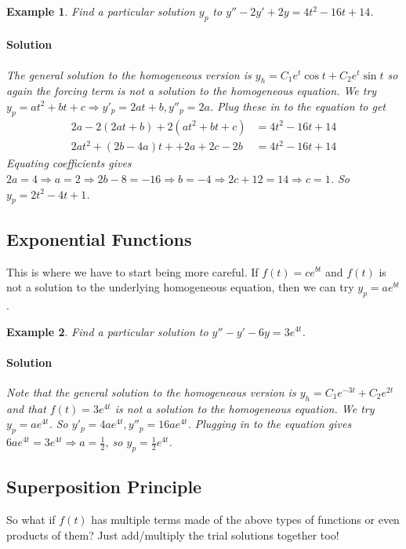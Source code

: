 \documentclass[letterpaper, 11pt, openany]{book}
\theoremstyle{mytheoremstyle}
\theoremstyle{myexamplestyle}
\newtheorem{example}{Example}[section]
\newenvironment{solution}{\paragraph{\sffamily \smaller \fontseries{b}\selectfont Solution}}{\hfill\faSquare}
\begin{document}
\begin{example}
    Find a particular solution \(y_{p}\) to \(y'' - 2y' + 2y  = 4 t^{2}-16 t+14\).
    \begin{solution}
        The general solution to the homogeneous version is \(y_{h} = C_{1} e^{t}\cos t + C_{2} e^{t}\sin t\) so again the forcing term is not a solution to the homogeneous equation. We try \(y_{p} = at^2 + bt + c \Rightarrow y'_{p} = 2at + b, y''_{p} = 2a\). Plug these in to the equation to get
        \begin{align*}
            2a - 2(2at + b) + 2(at^2 + bt + c) &= 4 t^{2}-16 t+14\\
            2at^{2} + (2b - 4a)t + + 2a + 2c - 2b & = 4 t^{2}-16 t+14
        \end{align*}
        Equating coefficients gives \(2a = 4 \Rightarrow a= 2 \Rightarrow 2b - 8 = -16 \Rightarrow b = -4 \Rightarrow 2c + 12 = 14 \Rightarrow c = 1\). So \(y_{p} = 2t^2 - 4t + 1\).
    \end{solution}
\end{example}

\subsection{Exponential Functions}
This is where we have to start being more careful. If \(f(t) = c e^{bt}\) and \(f(t)\) is not a solution to the underlying homogeneous equation, then we can try \(y_{p} = a e^{bt}\).

\begin{example}\label{e:de-undetcoef-exp}
    Find a particular solution to \(y'' - y' -6y = 3e^{4t}\).
    \begin{solution}
        Note that the general solution to the homogeneous version is \(y_{h} = C_{1} e^{-3t} + C_{2} e^{2t}\) and that \(f(t) = 3e^{4t}\) is not a solution to the homogeneous equation. We try \(y_{p} = a e^{4t}\). So \(y'_{p} = 4a e^{4t}, y''_{p} = 16ae^{4t}\). Plugging in to the equation gives \(6a e^{4t} = 3e^{4t} \Rightarrow a = \frac{1}{2}\), so \(y_p = \frac{1}{2}e^{4t}\).
    \end{solution}
\end{example}

\subsection{Superposition Principle}

So what if \(f(t)\) has multiple terms made of the above types of functions or even products of them? Just add/multiply the trial solutions together too!
\end{document}
